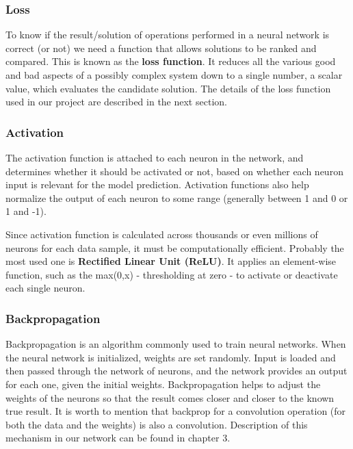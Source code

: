 \documentclass[../Main.tex]{subfiles}
\begin{document}
    
    \subsubsection{Loss}
    To know if the result/solution of operations performed in a neural network is correct (or not) we need a function that allows solutions to be ranked and compared. This is known as the \textbf{loss function}. It reduces all the various good and bad aspects of a possibly complex system down to a single number, a scalar value, which evaluates the candidate solution. 
    The details of the loss function used in our project are described in the next section.
    
    \subsubsection{Activation}
    The activation function is attached to each neuron in the network, and determines whether it should be activated or not, based on whether each neuron input is relevant for the model prediction. Activation functions also help normalize the output of each neuron to some range (generally between 1 and 0 or 1 and -1). 

    Since activation function is calculated across thousands or even millions of neurons for each data sample, it  must be computationally efficient. Probably the most used one is \textbf{Rectified Linear Unit (ReLU)}. It applies an element-wise  function, such as the max(0,x) - thresholding at zero - to activate or deactivate each single neuron.
    
    \subsubsection{Backpropagation}
    
    Backpropagation is an algorithm commonly used to train neural networks. When the neural network is initialized, weights are set randomly. Input is loaded and then passed through the network of neurons, and the network provides an output for each one, given the initial weights. Backpropagation helps to adjust the weights of the neurons so that the result comes closer and closer to the known true result. It is worth to mention that backprop for a convolution operation (for both the data and the weights) is also a convolution. Description of this mechanism in our network can be found in chapter 3.
\end{document}
